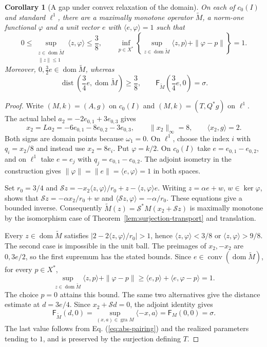 \documentclass[11pt]{article}
\newcommand{\gra}{\operatorname{gra}}
\newcommand{\dom}{\operatorname{dom}}
\newcommand{\pair}[2]{\langle #1,#2\rangle}
\newtheorem{corollary}{Corollary}
\theoremstyle{definition}
\theoremstyle{remark}
\newcommand{\dist}{\operatorname{dist}}
\begin{document}
\begin{corollary}[A gap under convex relaxation of the domain]
\label{cor:convex-relaxation-recovered}
On each of $c_0(I)$ and standard $\ell^1$, there are a maximally monotone operator $\widetilde M$, a norm-one functional $\varphi$ and a unit vector $e$ with $\pair{e}{\varphi}=1$ such that
\[
0\le\sup_{\substack{z\in\dom\widetilde M\\\|z\|\le1}}\pair{z}{\varphi}\le\frac38,
\qquad
\inf_{p\in X^*}\left\{\sup_{z\in\dom\widetilde M}\pair{z}{p}+\|\varphi-p\|\right\}=1.
\]
Moreover, $0,\frac32e\in\dom\widetilde M$, whereas
\[
\dist\left(\frac34e,\dom\widetilde M\right)\ge\frac38,
\qquad \mathsf F_{\widetilde M}\left(\frac34e,0\right)=\sigma.
\]
\end{corollary}
\begin{proof}
Write $(M,k)=(A,g)$ on $c_0(I)$ and $(M,k)=(T,Q^*g)$ on $\ell^1$. The actual label $a_2=-2e_{0,1}+3e_{0,3}$ gives
\[
x_2=La_2=-6e_{0,1}-8e_{0,2}-3e_{0,3},\qquad \|x_2\|_\infty=8,\qquad \pair{x_2}{g}=2.
\]
Both signs are domain points because $\omega_1=0$. On $\ell^1$, choose the index $i$ with $q_i=x_2/8$ and instead use $x_2=8e_i$. Put $\varphi=k/2$. On $c_0(I)$ take $e=e_{0,1}-e_{0,2}$, and on $\ell^1$ take $e=e_j$ with $q_j=e_{0,1}-e_{0,2}$. The adjoint isometry in the construction gives $\|\varphi\|=\|e\|=\pair{e}{\varphi}=1$ in both spaces.

Set $r_0=3/4$ and $\mathcal Sz=-x_2\pair{z}{\varphi}/r_0+z-\pair{z}{\varphi}e$. Writing $z=\alpha e+w$, $w\in\ker\varphi$, shows that $\mathcal Sz=-\alpha x_2/r_0+w$ and $\pair{\mathcal Sz}{\varphi}=-\alpha/r_0$. These equations give a bounded inverse. Consequently $\widetilde M(z)=\mathcal S^*M(x_2+\mathcal Sz)$ is maximally monotone by the isomorphism case of Theorem~\ref{lem:surjection-transport} and translation.

Every $z\in\dom\widetilde M$ satisfies $|2-2\pair{z}{\varphi}/r_0|>1$, hence $\pair{z}{\varphi}<3/8$ or $\pair{z}{\varphi}>9/8$. The second case is impossible in the unit ball. The preimages of $x_2,-x_2$ are $0,3e/2$, so the first supremum has the stated bounds. Since $e\in\operatorname{conv}(\dom\widetilde M)$, for every $p\in X^*$,
\[
\sup_{z\in\dom\widetilde M}\pair{z}{p}+\|\varphi-p\|
\ge\pair{e}{p}+\pair{e}{\varphi-p}=1.
\]
The choice $p=0$ attains this bound. The same two alternatives give the distance estimate at $d=3e/4$. Since $x_2+\mathcal Sd=0$, the adjoint identity gives
\[
\mathsf F_{\widetilde M}(d,0)
=\sup_{(x,a)\in\gra M}\pair{-x}{a}
=\mathsf F_M(0,0)=\sigma.
\]
The last value follows from Eq. (\ref{eq:abs-pairing}) and the realized parameters tending to $1$, and is preserved by the surjection defining $T$.
\end{proof}
\end{document}
